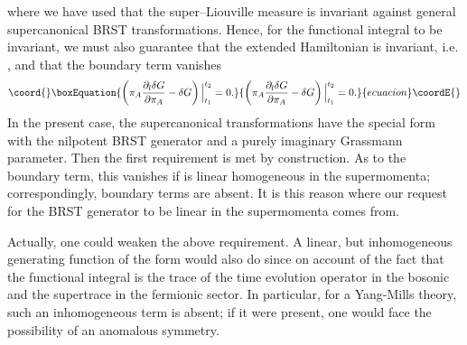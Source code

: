 \documentclass[a4paper,10pt]{article}
\begin{document}
where we have used that the super--Liouville measure \coordHE{} is invariant against general supercanonical BRST transformations. Hence, for the functional integral to be invariant, we must also guarantee that the extended Hamiltonian is invariant, i.e. \coordHE{}, and that the boundary term 
vanishes
\begin{equation}\coord{}\boxEquation{
\left(\pi_A\frac{\partial_l\delta G}{\partial\pi_A}-\delta G\right)\Big|^{t_2}_{t_1}=0.
}{
\left(\pi_A\frac{\partial_l\delta G}{\partial\pi_A}-\delta G\right)\Big|^{t_2}_{t_1}=0.
}{ecuacion}\coordE{}\end{equation}
In the present case, the supercanonical transformations have the special form \coordHE{} with \myHighlight{$\Omega$}\coordHE{} the nilpotent BRST generator and \myHighlight{$\delta\theta$}\coordHE{} a 
purely imaginary Grassmann parameter. Then the first requirement is met by construction. 
As to the boundary term, this vanishes if \coordHE{} is linear 
homogeneous in the supermomenta; correspondingly, boundary terms are absent. It is this reason where our request for the BRST generator to be linear in the supermomenta comes from.

Actually, one could weaken the above requirement. A linear, but inhomogeneous generating 
function of the form \coordHE{} would also do since \coordHE{} on account of the fact that the functional integral is the trace of the time evolution operator in the bosonic and 
the supertrace in the fermionic sector. In particular, for a Yang-Mills theory, such an inhomogeneous term is absent; if it were present, one would face the possibility of an anomalous symmetry.
\end{document}
